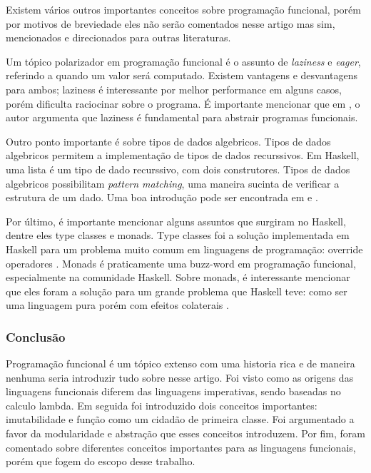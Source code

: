 Existem vários outros importantes conceitos sobre programação funcional, porém por motivos de breviedade eles não serão comentados nesse artigo mas sim, mencionados e direcionados para outras literaturas.

Um tópico polarizador em programação funcional é o assunto de \emph{laziness} e \emph{eager}, referindo a quando um valor será computado.
Existem vantagens e desvantagens para ambos; laziness é interessante por melhor performance em alguns casos, porém dificulta raciocinar sobre o programa.
É importante mencionar que em \cite{whyfpm}, o autor argumenta que laziness é fundamental para abstrair programas funcionais.

Outro ponto importante é sobre tipos de dados algebricos.
Tipos de dados algebricos permitem a implementação de tipos de dados recurssivos.
Em Haskell, uma lista é um tipo de dado recurssivo, com dois construtores.
Tipos de dados algebricos possibilitam \emph{pattern matching}, uma maneira sucinta de verificar a estrutura de um dado.
Uma boa introdução pode ser encontrada em \cite{lipovaca} e \cite{rust}.

Por último, é importante mencionar alguns assuntos que surgiram no Haskell, dentre eles type classes e monads.
Type classes foi a solução implementada em Haskell para um problema muito comum em linguagens de programação: override operadores \cite{haskell-ivory}.
Monads é praticamente uma buzz-word em programação funcional, especialmente na comunidade Haskell.
Sobre monads, é interessante mencionar que eles foram a solução para um grande problema que Haskell teve: como ser uma linguagem pura porém com efeitos colaterais \cite{haskell-ivory}.

\subsubsection{Conclusão}

Programação funcional é um tópico extenso com uma historia rica e de maneira nenhuma seria introduzir tudo sobre nesse artigo.
Foi visto como as origens das linguagens funcionais diferem das linguagens imperativas, sendo baseadas no calculo lambda.
Em seguida foi introduzido dois conceitos importantes: imutabilidade e função como um cidadão de primeira classe.
Foi argumentado a favor da modularidade e abstração que esses conceitos introduzem.
Por fim, foram comentado sobre diferentes conceitos importantes para as linguagens funcionais, porém que fogem do escopo desse trabalho.


